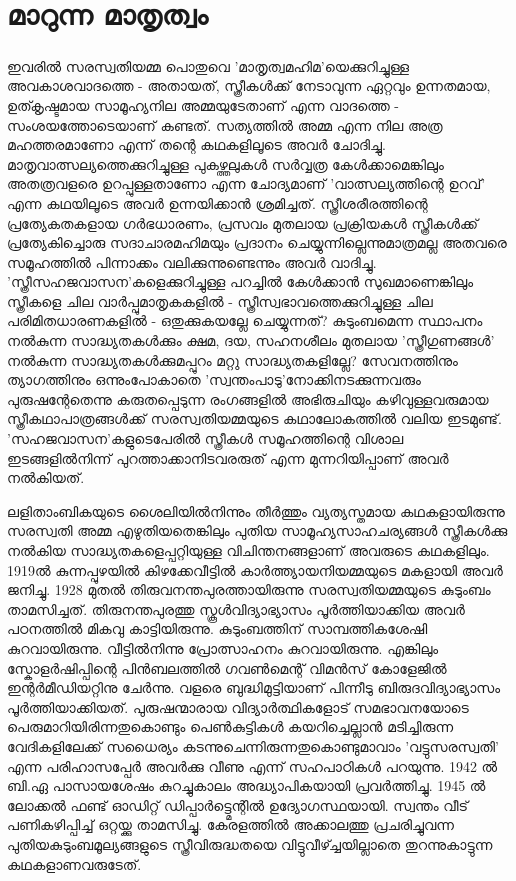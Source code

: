 \chapter{മാറുന്ന മാതൃത്വം}
\label{chapter6}

\paragraph{}
\label{saraswathy} ഇവരിൽ സരസ്വതിയമ്മ പൊതുവെ 'മാതൃത്വമഹിമ'യെക്കുറിച്ചുള്ള അവകാശവാദത്തെ - അതായത്, സ്ത്രീകൾക്ക് നേടാവുന്ന ഏറ്റവും ഉന്നതമായ, ഉത്കൃഷ്ടമായ സാമൂഹ്യനില അമ്മയുടേതാണ് എന്ന വാദത്തെ - സംശയത്തോടെയാണ് കണ്ടത്. സത്യത്തിൽ അമ്മ എന്ന നില അത്ര മഹത്തരമാണോ എന്ന് തന്റെ കഥകളിലൂടെ അവർ ചോദിച്ചു. മാതൃവാത്സല്യത്തെക്കുറിച്ചുള്ള പുകഴ്ത്തലുകൾ സർവ്വത്ര കേൾക്കാമെങ്കിലും അതത്രവളരെ ഉറപ്പുള്ളതാണോ എന്ന ചോദ്യമാണ് 'വാത്സല്യത്തിന്റെ ഉറവ്' എന്ന കഥയിലൂടെ അവർ ഉന്നയിക്കാൻ ശ്രമിച്ചത്. സ്ത്രീശരീരത്തിന്റെ പ്രത്യേകതകളായ ഗർഭധാരണം, പ്രസവം മുതലായ പ്രക്രിയകൾ സ്ത്രീകൾക്ക് പ്രത്യേകിച്ചൊരു സദാചാരമഹിമയും പ്രദാനം ചെയ്യുന്നില്ലെന്നുമാത്രമല്ല അതവരെ സമൂഹത്തിൽ പിന്നാക്കം വലിക്കുന്നുണ്ടെന്നും അവർ വാദിച്ചു. 'സ്ത്രീസഹജവാസന'കളെക്കുറിച്ചുള്ള പറച്ചിൽ കേൾക്കാൻ സുഖമാണെങ്കിലും സ്ത്രീകളെ ചില വാർപ്പുമാതൃകകളിൽ - സ്ത്രീസ്വഭാവത്തെക്കുറിച്ചുള്ള ചില പരിമിതധാരണകളിൽ - ഒതുക്കുകയല്ലേ ചെയ്യുന്നത്? കുടുംബമെന്ന സ്ഥാപനം നൽകുന്ന സാദ്ധ്യതകൾക്കും ക്ഷമ, ദയ, സഹനശീലം മുതലായ 'സ്ത്രീഗുണങ്ങൾ' നൽകുന്ന സാദ്ധ്യതകൾക്കുമപ്പുറം മറ്റു സാദ്ധ്യതകളില്ലേ? സേവനത്തിനും ത്യാഗത്തിനും ഒന്നുംപോകാതെ 'സ്വന്തംപാടു'നോക്കിനടക്കുന്നവരും പുരുഷന്റേതെന്നു കരുതപ്പെടുന്ന രംഗങ്ങളിൽ അഭിരുചിയും കഴിവുള്ളവരുമായ സ്ത്രീകഥാപാത്രങ്ങൾക്ക് സരസ്വതിയമ്മയുടെ കഥാലോകത്തിൽ വലിയ ഇടമുണ്ട്. 'സഹജവാസന'കളുടെപേരിൽ സ്ത്രീകൾ സമൂഹത്തിന്റെ വിശാല ഇടങ്ങളിൽനിന്ന് പുറത്താക്കാനിടവരരുത് എന്ന മുന്നറിയിപ്പാണ് അവർ നൽകിയത്.

\label{saraswathy}
\begin{tcolorbox}[%
 breakable, %
  arc=0mm, 
  left=1pt, right = 1pt, 
  boxrule=0mm,
  colback = {blue!10}, %
] 

ലളിതാംബികയുടെ ശൈലിയിൽനിന്നും തീർത്തും വ്യത്യസ്തമായ കഥകളായിരുന്നു സരസ്വതി അമ്മ എഴുതിയതെങ്കിലും പുതിയ സാമൂഹ്യസാഹചര്യങ്ങൾ സ്ത്രീകൾക്കു നൽകിയ സാദ്ധ്യതകളെപ്പറ്റിയുള്ള വിചിന്തനങ്ങളാണ് അവരുടെ കഥകളിലും. 1919ൽ കുന്നപ്പുഴയിൽ കിഴക്കേവീട്ടിൽ കാർത്ത്യായനിയമ്മയുടെ മകളായി അവർ ജനിച്ചു. 1928 മുതൽ തിരുവനന്തപുരത്തായിരുന്നു സരസ്വതിയമ്മയുടെ കുടുംബം താമസിച്ചത്. തിരുനന്തപുരത്തു സ്കൂൾവിദ്യാഭ്യാസം പൂർത്തിയാക്കിയ അവർ പഠനത്തിൽ മികവു കാട്ടിയിരുന്നു. കുടുംബത്തിന് സാമ്പത്തികശേഷി കുറവായിരുന്നു. വീട്ടിൽനിന്നു പ്രോത്സാഹനം കുറവായിരുന്നു. എങ്കിലും സ്കോളർഷിപ്പിന്റെ പിൻബലത്തിൽ ഗവൺമെന്റ് വിമൻസ് കോളേജിൽ ഇന്റർമീഡിയറ്റിനു ചേർന്നു. വളരെ ബുദ്ധിമുട്ടിയാണ് പിന്നീടു ബിരുദവിദ്യാഭ്യാസം പൂർത്തിയാക്കിയത്. പുരുഷന്മാരായ വിദ്യാർത്ഥികളോട് സമഭാവനയോടെ പെരുമാറിയിരിന്നതുകൊണ്ടും പെൺകുട്ടികൾ കയറിച്ചെല്ലാൻ മടിച്ചിരുന്ന വേദികളിലേക്ക് സധൈര്യം കടന്നുചെന്നിരുന്നതുകൊണ്ടുമാവാം 'വട്ടുസരസ്വതി' എന്ന പരിഹാസപ്പേർ അവർക്കു വീണു എന്ന് സഹപാഠികൾ പറയുന്നു. 1942 ൽ ബി.ഏ പാസായശേഷം കുറച്ചുകാലം അദ്ധ്യാപികയായി പ്രവർത്തിച്ചു. 1945 ൽ ലോക്കൽ ഫണ്ട് ഓഡിറ്റ് ഡിപ്പാർട്ട്മെന്റിൽ ഉദ്യോഗസ്ഥയായി. സ്വന്തം വീട് പണികഴിപ്പിച്ച് ഒറ്റയ്ക്കു താമസിച്ചു. കേരളത്തിൽ അക്കാലത്തു പ്രചരിച്ചുവന്ന പുതിയകുടുംബമൂല്യങ്ങളുടെ സ്ത്രീവിരുദ്ധതയെ വിട്ടുവീഴ്ച്ചയില്ലാതെ തുറന്നുകാട്ടുന്ന കഥകളാണവരുടേത്.
\end{tcolorbox}
